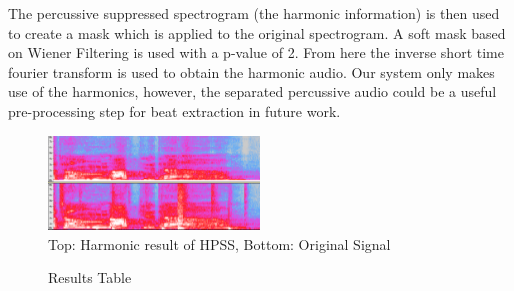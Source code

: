 \documentclass{article}
\begin{document}
The percussive suppressed spectrogram (the harmonic information) is then used
to create a mask which is applied to the original spectrogram. A soft mask
based on Wiener Filtering is used with a p-value of 2. From here the inverse
short time fourier transform is used to obtain the harmonic audio. Our system
only makes use of the harmonics, however, the  separated percussive audio could
be a useful pre-processing step for beat extraction in future work.

\begin{figure}
   \centering
    \includegraphics[width=0.5\textwidth]{hpssspec.png}
   \caption{Top: Harmonic result of HPSS, Bottom: Original Signal}
   \label{fig:HPSS}
\end{figure}


\begin{figure}
\caption{Results Table}
\label{fig:resulttable}
\end{figure}
\end{document}
